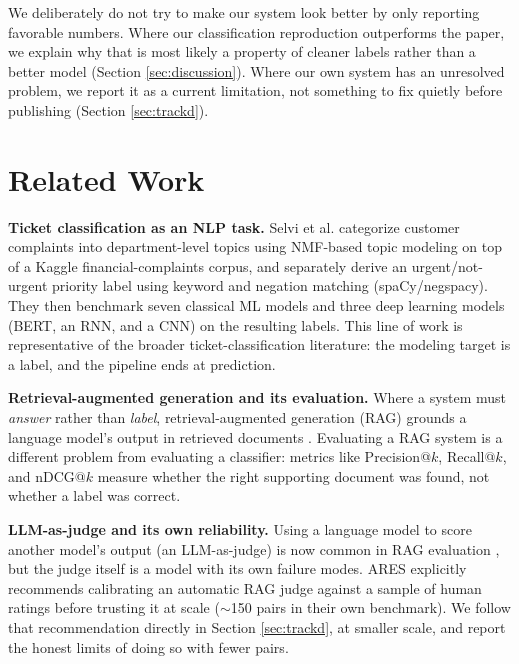 \documentclass[conference]{IEEEtran}
\begin{document}
We deliberately do not try to make our system look better by only reporting favorable numbers. Where our classification reproduction outperforms the paper, we explain why that is most likely a property of cleaner labels rather than a better model (Section \ref{sec:discussion}). Where our own system has an unresolved problem, we report it as a current limitation, not something to fix quietly before publishing (Section \ref{sec:trackd}).

\section{Related Work}

\textbf{Ticket classification as an NLP task.} Selvi et al. \cite{selvi2025} categorize customer complaints into department-level topics using NMF-based topic modeling on top of a Kaggle financial-complaints corpus, and separately derive an urgent/not-urgent priority label using keyword and negation matching (spaCy/negspacy). They then benchmark seven classical ML models and three deep learning models (BERT, an RNN, and a CNN) on the resulting labels. This line of work is representative of the broader ticket-classification literature: the modeling target is a label, and the pipeline ends at prediction.

\textbf{Retrieval-augmented generation and its evaluation.} Where a system must \emph{answer} rather than \emph{label}, retrieval-augmented generation (RAG) grounds a language model's output in retrieved documents \cite{lewis2020rag}. Evaluating a RAG system is a different problem from evaluating a classifier: metrics like Precision@$k$, Recall@$k$, and nDCG@$k$ \cite{jarvelin2002ndcg} measure whether the right supporting document was found, not whether a label was correct.

\textbf{LLM-as-judge and its own reliability.} Using a language model to score another model's output (an LLM-as-judge) is now common in RAG evaluation \cite{saadfalcon2024ares, zheng2023judging}, but the judge itself is a model with its own failure modes. ARES \cite{saadfalcon2024ares} explicitly recommends calibrating an automatic RAG judge against a sample of human ratings before trusting it at scale ($\sim$150 pairs in their own benchmark). We follow that recommendation directly in Section \ref{sec:trackd}, at smaller scale, and report the honest limits of doing so with fewer pairs.
\end{document}
